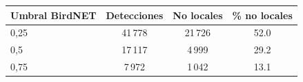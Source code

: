 \begin{tabular}{lccc}
\toprule
Umbral BirdNET & Detecciones & No locales & \% no locales\\
\midrule
0,25 & 41\,778 & 21\,726 & 52.0\\
0,5 & 17\,117 & 4\,999 & 29.2\\
0,75 & 7\,972 & 1\,042 & 13.1\\
\bottomrule
\end{tabular}

